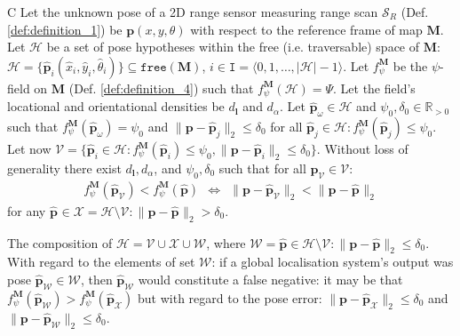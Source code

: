 \begin{customcnj}{C}
  \label{cnj:conjecture_c}
  Let the unknown pose of a 2D range sensor measuring range scan $\mathcal{S}_R$
  (Def. \ref{def:definition_1}) be $\bm{p}(x,y,\theta)$ with respect to the
  reference frame of map $\bm{M}$.
  Let $\mathcal{H}$ be a set of pose hypotheses within the free (i.e.
  traversable) space of $\bm{M}$:
  $\mathcal{H} = \{\hat{\bm{p}}_i(\hat{x}_i,\hat{y}_i,\hat{\theta}_i)\} \subseteq \texttt{free}(\bm{M})$,
  $i \in \texttt{I} = \langle 0,1,\dots,|\mathcal{H}|-1\rangle$.
  Let $f_{\psi}^{\bm{M}}$ be the $\psi$-field on $\bm{M}$
  (Def. \ref{def:definition_4}) such that $f_{\psi}^{\bm{M}}(\mathcal{H})= \Psi$.
  Let the field's locational and orientational densities be
  $d_{\bm{l}}$ and $d_{\alpha}$.
  Let $\hat{\bm{p}}_\omega \in \mathcal{H}$ and $\psi_0,\delta_0 \in \mathbb{R}_{>0}$
  such that $f_{\psi}^{\bm{M}}(\hat{\bm{p}}_\omega ) = \psi_0$ and
  $\|\bm{p}-\hat{\bm{p}}_j\|_2 \leq \delta_0$ for all
  $\hat{\bm{p}}_j \in \mathcal{H}: f_{\psi}^{\bm{M}}(\hat{\bm{p}}_j) \leq \psi_0$.
  Let now $\mathcal{V} = \{\hat{\bm{p}}_i \in \mathcal{H}: f_{\psi}^{\bm{M}}(\hat{\bm{p}}_i) \leq \psi_0,
  \|\bm{p}-\hat{\bm{p}}_i\|_2 \leq \delta_0\}$.
  Without loss of generality there exist $d_{\bm{l}}, d_{\alpha}$, and
  $\psi_0,\delta_0$ such that for all
  $\hat{\bm{p}}_\mathcal{V} \in \mathcal{V}$:
  \begin{align}
    f_{\psi}^{\bm{M}}(\hat{\bm{p}}_\mathcal{V}) < f_{\psi}^{\bm{M}}(\hat{\bm{p}}) \ \ \Leftrightarrow \ \
    \|\bm{p}-\hat{\bm{p}}_\mathcal{V}\|_2 < \|\bm{p}-\hat{\bm{p}}_{}\|_2 \nonumber
  \end{align}
  for any $\hat{\bm{p}}_{} \in \mathcal{X} = \mathcal{H} \setminus  \mathcal{V}: \|\bm{p}-\hat{\bm{p}}_{}\|_2 > \delta_0$.
\end{customcnj}

\begin{remark}
  \label{rem:remark_1}
  The composition of
  $\mathcal{H} = \mathcal{V} \cup \mathcal{X} \cup \mathcal{W}$, where
  $\mathcal{W} = \hat{\bm{p}} \in {\mathcal{H} \setminus \mathcal{V}}: \|\bm{p}-\hat{\bm{p}}\|_2 \leq \delta_0$.
  With regard to the elements of set $\mathcal{W}$: if a global localisation
  system's output was pose
  $\hat{\bm{p}}_{\mathcal{W}} \in \mathcal{W}$, then
  $\hat{\bm{p}}_{\mathcal{W}}$ would constitute a false
  negative: it may be that
  $f_{\psi}^{\bm{M}}(\hat{\bm{p}}_{\mathcal{W}}) > f_{\psi}^{\bm{M}}(\hat{\bm{p}}_{\mathcal{X}})$
  but with regard to the pose error:
  $\|\bm{p}-\hat{\bm{p}}_{\mathcal{X}}\|_2 \leq \delta_0$ and
  $\|\bm{p}-\hat{\bm{p}}_{\mathcal{W}}\|_2 \leq \delta_0$.
\end{remark}

